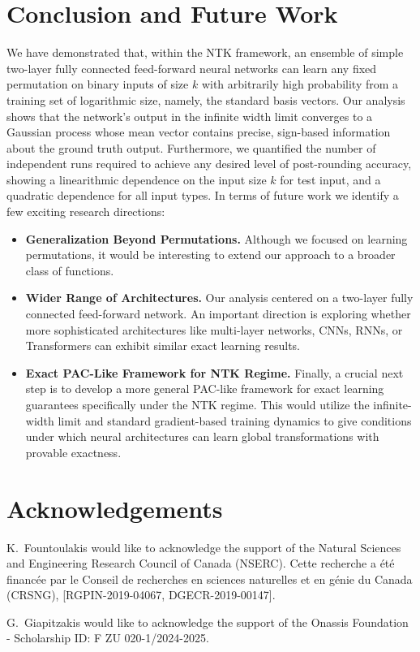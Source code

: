 \section{Conclusion and Future Work}
We have demonstrated that, within the NTK framework, an ensemble of simple two-layer fully connected feed-forward neural networks can learn any fixed permutation on binary inputs of size $k$ with arbitrarily high probability from a training set of logarithmic size, namely, the standard basis vectors. Our analysis shows that the network’s output in the infinite width limit converges to a Gaussian process whose mean vector contains precise, sign-based information about the ground truth output. Furthermore, we quantified the number of independent runs required to achieve any desired level of post-rounding accuracy, showing a linearithmic dependence on the input size $k$ for test input, and a quadratic dependence for all input types. In terms of future work we identify a few exciting research directions:
\begin{itemize}
    \item \textbf{Generalization Beyond Permutations.} Although we focused on learning permutations, it would be interesting to extend our approach to a broader class of functions.
    \item \textbf{Wider Range of Architectures.} Our analysis centered on a two-layer fully connected feed-forward network. An important direction is exploring whether more sophisticated architectures like multi-layer networks, CNNs, RNNs, or Transformers can exhibit similar exact learning results.
    \item \textbf{Exact PAC-Like Framework for NTK Regime.} Finally, a crucial next step is to develop a more general PAC-like framework for exact learning guarantees specifically under the NTK regime. This would utilize the infinite-width limit and standard gradient-based training dynamics to give conditions under which neural architectures can learn global transformations with provable exactness. 
\end{itemize}

\section*{Acknowledgements}

K.~Fountoulakis would like to acknowledge the support of the Natural Sciences and Engineering Research Council of Canada (NSERC). Cette recherche a \'et\'e financ\'ee par le Conseil de recherches en sciences naturelles et en g\'enie du Canada (CRSNG), [RGPIN-2019-04067, DGECR-2019-00147].

G.~Giapitzakis would like to acknowledge the support of the Onassis Foundation - Scholarship ID: F ZU 020-1/2024-2025.
